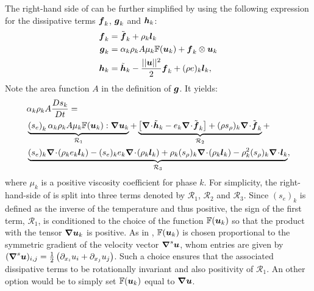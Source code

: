 The right-hand side of  can be further simplified by using the following expression
for the dissipative terms $\boldsymbol f_k$,  $\boldsymbol g_k$ and $\boldsymbol h_k$:
\begin{align}\label{eq:def-diss-terms-sect4}
  \boldsymbol f_k &= \tilde{\boldsymbol f}_k + \rho_k \boldsymbol l_k 
  \\
  \boldsymbol g_k &= \alpha_k \rho_k A \mu_k \mathbb{F}(\boldsymbol u_k) + \boldsymbol f_k \otimes \boldsymbol u_k
  \\
  \boldsymbol h_k &= \tilde{\boldsymbol h}_k - \frac{|| \boldsymbol u||^2 }{2} \boldsymbol f_k + (\rho e)_k \boldsymbol l_k,
\end{align}
Note the area function $A$ in the definition of $\boldsymbol g$. It yields:
%
\begin{align}\label{eq:ent-res-7-eqn-diss-terms2}
&\alpha_k \rho_k A \frac{Ds_k}{Dt} = \nonumber \\
&\underbrace{\left(s_e\right)_k \alpha_k \rho_k A \mu_k \mathbb{F}(\mbold u_k) : \grad \mbold u_k}_{\mathcal{R}_1} +
\underbrace{\left[ \div \tilde{\mbold h}_k  - e_k \div \tilde{\mbold f}_k  \right] + (\rho s_\rho)_k \div \tilde{\mbold f}_k}_{\mathcal{R}_2} + \nonumber \\
&\underbrace{(s_e)_k \div \left( \rho_k e_k \mbold l_k \right) -  (s_e)_k e_k \div \left( \rho_k \mbold l_k \right) + \rho_k (s_\rho)_k \div \left( \rho_k \mbold l_k \right) 
  - \rho_k^2 (s_\rho)_k \div \mbold l_k}_{\mathcal{R}_3},
\end{align}
%
where $\mu_k$ is a positive viscosity coefficient for phase $k$. For simplicity, the right-hand-side of  is split into three terms denoted by $\mathcal{R}_1$, $\mathcal{R}_2$ and $\mathcal{R}_3$. Since $(s_e)_k$ is defined as the inverse of the temperature and thus positive, the sign of the first term, $\mathcal{R}_1$, is conditioned to the choice of the function $\mathbb{F}(\boldsymbol u_k)$ so that the product with the tensor $\boldsymbol{\nabla} \boldsymbol u_k$ is positive. As in \cite{jlg}, $\mathbb{F}(\boldsymbol u_k)$ is chosen proportional to the symmetric gradient of the velocity vector $\boldsymbol{\nabla}^s \boldsymbol u$, whom entries are given by $(\boldsymbol{\nabla}^s \boldsymbol u)_{i,j} = \frac{1}{2} \left( \partial_{x_i} u_i + \partial_{x_j} u_j \right)$. Such a choice ensures that the associated dissipative terms to be rotationally invariant and also positivity of $\mathcal{R}_1$. An other option would be to simply set $\mathbb{F}(\boldsymbol u_k)$ equal to $\boldsymbol{\nabla} \boldsymbol u$. 

